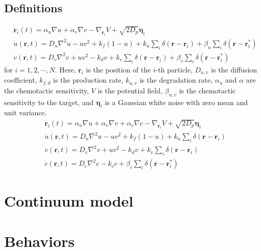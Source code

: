\documentclass{article}
\begin{document}
\subsection{Definitions}
\begin{subequations}
    \begin{align}
        &\dot{\mathbf{r}}_i\left( t \right) =\alpha _u\nabla u+\alpha_v \nabla v-\nabla _{\mathbf{r}_i}V+\sqrt{2D_p}\mathbf{\eta }_i\\
        &\dot{u}\left( \mathbf{r},t \right)=D_u\nabla ^2u-uv^2+k_f\left( 1-u \right) +k_u\sum\nolimits_i^{}{\delta \left( \mathbf{r}-\mathbf{r}_i \right)}+\beta _u\sum\nolimits_i^{}{\delta \left( \mathbf{r}-\mathbf{r}_{i}^{*} \right)}\\
        &\dot{v}\left( \mathbf{r},t \right)=D_v\nabla ^2v+uv^2-k_dv+k_v\sum\nolimits_i^{}{\delta \left( \mathbf{r}-\mathbf{r}_i \right)}+\beta _v\sum\nolimits_i^{}{\delta \left( \mathbf{r}-\mathbf{r}_{i}^{*} \right)}
    \end{align}
\end{subequations}
for $i=1,2,\cdots,N$. Here, $\mathbf{r}_i$ is the position of the $i$-th particle, $D_{u,v}$ is the diffusion coefficient, $k_{f,d}$ is the production rate, $k_{u,v}$ is the degradation rate, $\alpha _u$ and $\alpha$ are the chemotactic sensitivity, $V$ is the potential field, $\beta _{u,v}$ is the chemotactic sensitivity to the target, and $\mathbf{\eta }_i$ is a Gaussian white noise with zero mean and unit variance.
\begin{subequations}
    \begin{align}
        &\dot{\mathbf{r}}_i\left( t \right) =\alpha _u\nabla u+\alpha_v \nabla v+\alpha_c \nabla c-\nabla _{\mathbf{r}_i}V+\sqrt{2D_p}\mathbf{\eta }_i\\
        &\dot{u}\left( \mathbf{r},t \right) =D_u\nabla ^2u-uv^2+k_f\left( 1-u \right) +k_u\sum\nolimits_i^{}{\delta \left( \mathbf{r}-\mathbf{r}_i \right)}\\
        &\dot{v}\left( \mathbf{r},t \right) =D_v\nabla ^2v+uv^2-k_dv+k_v\sum\nolimits_i^{}{\delta \left( \mathbf{r}-\mathbf{r}_i \right)}\\
        &\dot{c}\left( \mathbf{r},t \right) =D_c\nabla ^2c-k_cc+\beta _c\sum\nolimits_i^{}{\delta \left( \mathbf{r}-\mathbf{r}_{i}^{*} \right)}
    \end{align}
\end{subequations}


\section{Continuum model}

\newpage
\section{Behaviors}


\end{document}
